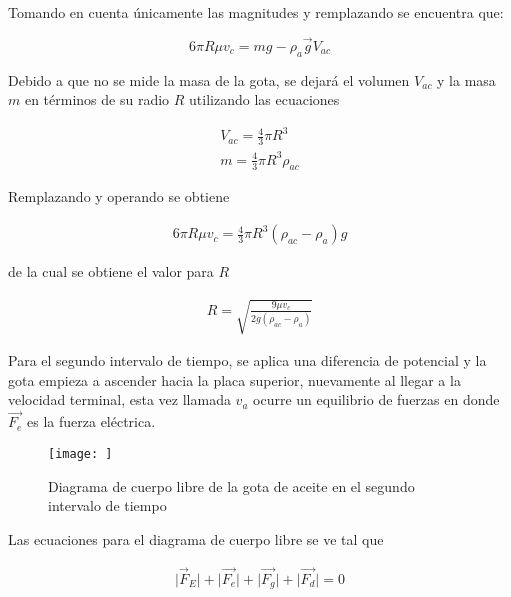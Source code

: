 Tomando en cuenta únicamente las magnitudes y remplazando se encuentra que:

\begin{equation}
    6\pi R\mu v_c=mg-\rho_a \Vec{g}V_{ac}
\end{equation}

Debido a que no se mide la masa de la gota, se dejará el volumen $V_{ac}$ y la masa $m$ en términos de su radio $R$ utilizando las ecuaciones

\begin{equation}
    \begin{split}
        V_{ac}=\frac{4}{3}\pi R^3\\
        m=\frac{4}{3}\pi R^3\rho_{ac}
    \end{split}
\end{equation}

Remplazando y operando se obtiene

\begin{equation}
    \begin{split}
        6\pi R\mu v_c=\frac{4}{3}\pi R^3(\rho_{ac}-\rho_a)g
    \end{split}
\end{equation}

de la cual se obtiene el valor para $R$

\begin{equation}
    \begin{split}
        R=\sqrt{\frac{9\mu v_c}{2g(\rho_{ac}-\rho_a)}}
    \end{split}
\end{equation}

Para el segundo intervalo de tiempo, se aplica una diferencia de potencial y la gota empieza a ascender hacia la placa superior, nuevamente al llegar a la velocidad terminal, esta vez llamada $v_a$ ocurre un equilibrio de fuerzas en donde $\Vec{F_e}$ es la fuerza eléctrica.

\begin{figure}
    \centering
    \texttt{[image: ]}
    \caption{Diagrama de cuerpo libre de la gota de aceite en el segundo intervalo de tiempo}
    \label{fig:enter-label}
\end{figure}

Las ecuaciones para el diagrama de cuerpo libre se ve tal que

\begin{equation}
    \begin{split}
        \lvert\Vec{F}_E\rvert + \lvert \Vec{F_e}\rvert + \lvert \Vec{F_g}\rvert+\lvert \Vec{F_d}\rvert =0
    \end{split}
\end{equation}

